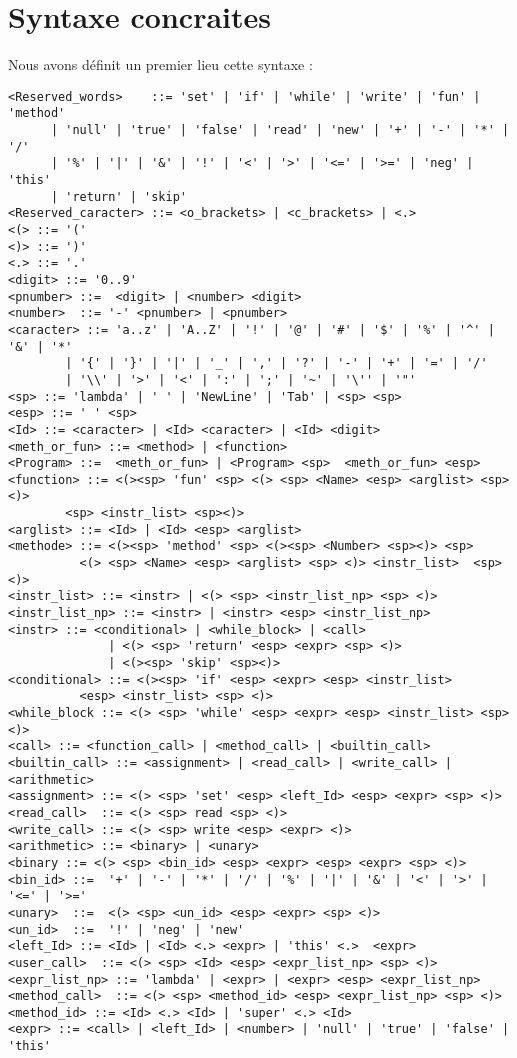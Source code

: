 \section*{Syntaxe concraites}

Nous avons définit un premier lieu cette syntaxe : 

\begin{verbatim}
<Reserved_words>    ::= 'set' | 'if' | 'while' | 'write' | 'fun' | 'method' 
      | 'null' | 'true' | 'false' | 'read' | 'new' | '+' | '-' | '*' | '/' 
      | '%' | '|' | '&' | '!' | '<' | '>' | '<=' | '>=' | 'neg' | 'this' 
      | 'return' | 'skip'
<Reserved_caracter> ::= <o_brackets> | <c_brackets> | <.>
<(> ::= '('
<)> ::= ')'
<.> ::= '.'
<digit> ::= '0..9' 
<pnumber> ::=  <digit> | <number> <digit> 
<number>  ::= '-' <pnumber> | <pnumber>
<caracter> ::= 'a..z' | 'A..Z' | '!' | '@' | '#' | '$' | '%' | '^' | '&' | '*' 
		| '{' | '}' | '|' | '_' | ',' | '?' | '-' | '+' | '=' | '/' 
		| '\\' | '>' | '<' | ':' | ';' | '~' | '\'' | '"' 
<sp> ::= 'lambda' | ' ' | 'NewLine' | 'Tab' | <sp> <sp>
<esp> ::= ' ' <sp>
<Id> ::= <caracter> | <Id> <caracter> | <Id> <digit>   
<meth_or_fun> ::= <method> | <function>
<Program> ::=  <meth_or_fun> | <Program> <sp>  <meth_or_fun> <esp>
<function> ::= <(><sp> 'fun' <sp> <(> <sp> <Name> <esp> <arglist> <sp><)> 
		<sp> <instr_list> <sp><)> 
<arglist> ::= <Id> | <Id> <esp> <arglist>
<methode> ::= <(><sp> 'method' <sp> <(><sp> <Number> <sp><)> <sp> 
	      <(> <sp> <Name> <esp> <arglist> <sp> <)> <instr_list>  <sp> <)>
<instr_list> ::= <instr> | <(> <sp> <instr_list_np> <sp> <)> 
<instr_list_np> ::= <instr> | <instr> <esp> <instr_list_np>
<instr> ::= <conditional> | <while_block> | <call> 
			  | <(> <sp> 'return' <esp> <expr> <sp> <)> 
			  | <(><sp> 'skip' <sp><)>
<conditional> ::= <(><sp> 'if' <esp> <expr> <esp> <instr_list>
		  <esp> <instr_list> <sp> <)> 
<while_block ::= <(> <sp> 'while' <esp> <expr> <esp> <instr_list> <sp> <)> 
<call> ::= <function_call> | <method_call> | <builtin_call> 
<builtin_call> ::= <assignment> | <read_call> | <write_call> | <arithmetic>
<assignment> ::= <(> <sp> 'set' <esp> <left_Id> <esp> <expr> <sp> <)> 
<read_call>  ::= <(> <sp> read <sp> <)> 
<write_call> ::= <(> <sp> write <esp> <expr> <)>
<arithmetic> ::= <binary> | <unary>
<binary ::= <(> <sp> <bin_id> <esp> <expr> <esp> <expr> <sp> <)>
<bin_id> ::=  '+' | '-' | '*' | '/' | '%' | '|' | '&' | '<' | '>' | '<=' | '>='
<unary>  ::=  <(> <sp> <un_id> <esp> <expr> <sp> <)>
<un_id>  ::=  '!' | 'neg' | 'new'
<left_Id> ::= <Id> | <Id> <.> <expr> | 'this' <.>  <expr>
<user_call>  ::= <(> <sp> <Id> <esp> <expr_list_np> <sp> <)>
<expr_list_np> ::= 'lambda' | <expr> | <expr> <esp> <expr_list_np>
<method_call>  ::= <(> <sp> <method_id> <esp> <expr_list_np> <sp> <)>
<method_id> ::= <Id> <.> <Id> | 'super' <.> <Id> 
<expr> ::= <call> | <left_Id> | <number> | 'null' | 'true' | 'false' | 'this'  
\end{verbatim}

